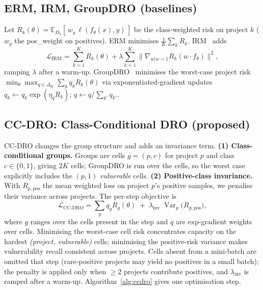 \documentclass[conference]{IEEEtran}
\begin{document}
\subsection{ERM, IRM, GroupDRO (baselines)}
Let $R_k(\theta)=\mathbb{E}_{D_k}[\,w_y\,\ell(f_\theta(x),y)\,]$ be
the class-weighted risk on project $k$ ($w_y$ the pos\_weight on
positives). ERM minimises $\frac1K\sum_k R_k$. IRM~\cite{irm} adds
\begin{equation}
\mathcal{L}_{\text{IRM}}=\sum_{k=1}^{K}R_k(\theta)
+\lambda\sum_{k=1}^{K}\big\|\nabla_{w|w=1}R_k(w\!\cdot\! f_\theta)\big\|^2,
\end{equation}
ramping $\lambda$ after a warm-up. GroupDRO~\cite{dro} minimises
the worst-case project risk
$\min_\theta\max_{q\in\Delta_K}\sum_k q_k R_k(\theta)$ via
exponentiated-gradient updates
$q_k\leftarrow q_k\exp(\eta_q R_k);\, q\leftarrow q/\sum_{k'}q_{k'}$.

\subsection{CC-DRO: Class-Conditional DRO (proposed)}
\label{sec:ccdro}
CC-DRO changes the group structure and adds an invariance term.
\textbf{(1) Class-conditional groups.} Groups are cells
$g=(p,c)$ for project $p$ and class $c\in\{0,1\}$, giving $2K$
cells; GroupDRO is run over the cells, so the worst case
explicitly includes the $(p,1)$ \emph{vulnerable} cells.
\textbf{(2) Positive-class invariance.} With $R_{p,\text{pos}}$ the
mean weighted loss on project $p$'s positive samples, we penalise
their variance across projects. The per-step objective is
\begin{equation}
\label{eq:ccdro}
\mathcal{L}_{\text{CC-DRO}}=\sum_{g} q_g R_g(\theta)
\;+\;\lambda_{\text{inv}}\;\operatorname{Var}_{p}\!\big(R_{p,\text{pos}}\big),
\end{equation}
where $g$ ranges over the cells present in the step and $q$ are
exp-gradient weights over cells. Minimising the worst-case cell
risk concentrates capacity on the hardest \emph{(project,
vulnerable)} cells; minimising the positive-risk variance makes
vulnerability recall consistent across projects. Cells absent from
a mini-batch are omitted that step (rare-positive projects may
yield no positives in a small batch); the penalty is applied only
when $\ge 2$ projects contribute positives, and $\lambda_{\text{inv}}$
is ramped after a warm-up. Algorithm~\ref{alg:ccdro} gives one
optimisation step.
\end{document}
